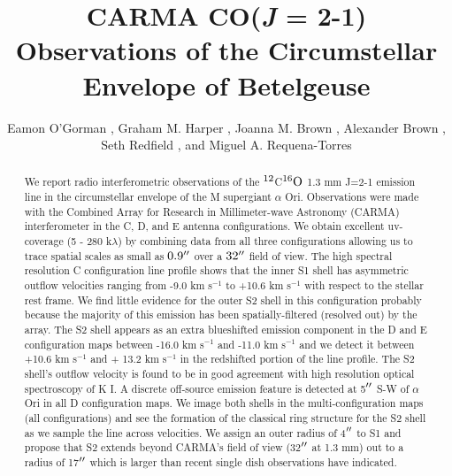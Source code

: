 \documentclass[iop]{emulateapj}
\begin{document}
\title{CARMA CO(\textit{J} = 2-1) Observations of the Circumstellar \\ Envelope of Betelgeuse}


\author{Eamon O'Gorman , Graham M. Harper  , Joanna M. Brown , Alexander Brown , Seth Redfield , and Miguel A. Requena-Torres  }


\begin{abstract}
We report radio interferometric observations of the $\rm{{}^{12}}$C$\rm{{}^{16}}O$ 1.3 mm J=2-1 emission line in the circumstellar envelope of the M supergiant $\alpha$ Ori.  Observations were made with the Combined Array for Research in Millimeter-wave Astronomy (CARMA) interferometer in the C, D, and E antenna configurations. We obtain excellent  uv-coverage (5 - 280 k$\lambda$) by combining data from all three configurations allowing us to trace spatial scales as small as $0.9\mbox{$^{\prime\prime}$}$ over a $32\mbox{$^{\prime\prime}$}$ field of view. The high spectral resolution C configuration line profile shows that the inner S1 shell has asymmetric outflow velocities ranging from -9.0 km s${}^{-1}$ to +10.6 km s${}^{-1}$ with respect to the stellar rest frame. We find little evidence  for the outer S2 shell in this configuration probably because the majority of this emission has been spatially-filtered (resolved out) by the array. The S2 shell appears as an extra blueshifted emission component in the D and E configuration maps between -16.0 km s${}^{-1}$  and -11.0 km s${}^{-1}$ and we detect it between +10.6 km s${}^{-1}$ and + 13.2 km s${}^{-1}$ in the redshifted portion of the line profile. The S2 shell's outflow velocity is found to be in good agreement with high resolution optical spectroscopy of K I. A discrete off-source emission feature is detected at 5$\mbox{$^{\prime\prime}$}$ S-W of  $\alpha$ Ori in all D configuration maps. We image both shells in the multi-configuration maps (all configurations) and see the formation of the classical ring structure for the S2 shell as we sample the line across velocities. We assign an outer radius of 4$\mbox{$^{\prime\prime}$}$ to S1 and propose that S2 extends beyond CARMA's field of view (32$\mbox{$^{\prime\prime}$}$ at 1.3 mm) out to a radius of 17$\mbox{$^{\prime\prime}$}$ which is larger than recent single dish observations have indicated. 
\end{abstract}
\end{document}
